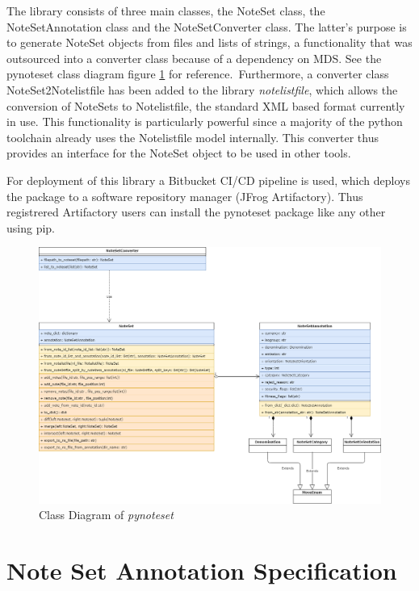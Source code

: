The library consists of three main classes, the NoteSet class, the NoteSetAnnotation class and the NoteSetConverter class. The latter's purpose is to generate NoteSet objects from files and lists of strings, a functionality that was outsourced into a converter class because of a dependency on MDS. See the pynoteset class diagram figure \ref{fig:pynoteset} for reference.\
Furthermore, a converter class NoteSet2Notelistfile has been added to the library \emph{notelistfile}, which allows the conversion of NoteSets to Notelistfile, the standard XML based format currently in use. This functionality is particularly powerful since a majority of the python toolchain already uses the Notelistfile model internally. This converter thus provides an interface for the NoteSet object to be used in other tools.\par
For deployment of this library a Bitbucket CI/CD pipeline is used, which deploys the package to a software repository manager (JFrog Artifactory). Thus registrered Artifactory users can install the pynoteset package like any other using pip.
\begin{figure}
 \includegraphics[width=\linewidth]{images/pynoteset.png}
   \caption{Class Diagram of \emph{pynoteset}}\label{fig:pynoteset}
\end{figure}

\section{Note Set Annotation Specification}
\label{ns_annotation_spec}

